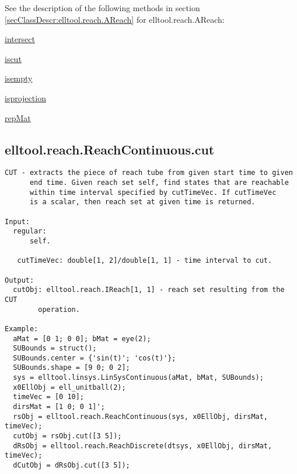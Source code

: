 See the description of the following methods in section \ref{secClassDescr:elltool.reach.AReach}
 for elltool.reach.AReach:

\begin{list}{}{}
 \item \hyperref[method:elltool.reach.AReach.intersect]{intersect}
 \item \hyperref[method:elltool.reach.AReach.iscut]{iscut}
 \item \hyperref[method:elltool.reach.AReach.isempty]{isempty}
 \item \hyperref[method:elltool.reach.AReach.isprojection]{isprojection}
 \item \hyperref[method:elltool.reach.AReach.repMat]{repMat}
\end{list}
\subsection{\texorpdfstring{elltool.reach.ReachContinuous.cut}{cut}}\label{method:elltool.reach.ReachContinuous.cut}
\begin{verbatim}
CUT - extracts the piece of reach tube from given start time to given
      end time. Given reach set self, find states that are reachable
      within time interval specified by cutTimeVec. If cutTimeVec
      is a scalar, then reach set at given time is returned.

Input:
  regular:
      self.

   cutTimeVec: double[1, 2]/double[1, 1] - time interval to cut.

Output:
  cutObj: elltool.reach.IReach[1, 1] - reach set resulting from the CUT
        operation.

Example:
  aMat = [0 1; 0 0]; bMat = eye(2);
  SUBounds = struct();
  SUBounds.center = {'sin(t)'; 'cos(t)'};
  SUBounds.shape = [9 0; 0 2];
  sys = elltool.linsys.LinSysContinuous(aMat, bMat, SUBounds);
  x0EllObj = ell_unitball(2);
  timeVec = [0 10];
  dirsMat = [1 0; 0 1]';
  rsObj = elltool.reach.ReachContinuous(sys, x0EllObj, dirsMat, timeVec);
  cutObj = rsObj.cut([3 5]);
  dRsObj = elltool.reach.ReachDiscrete(dtsys, x0EllObj, dirsMat, timeVec);
  dCutObj = dRsObj.cut([3 5]);
\end{verbatim}
